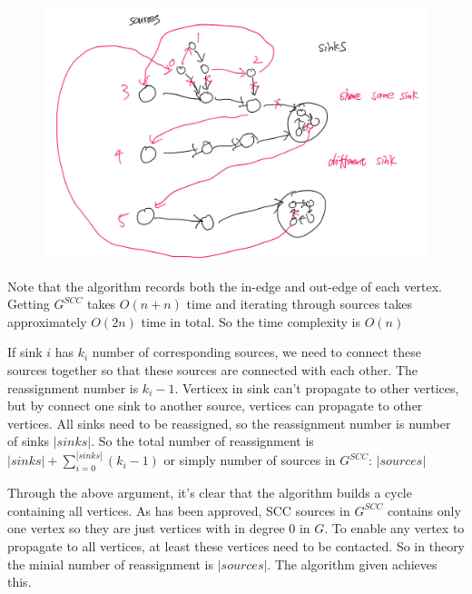 \documentclass[12pt,a4paper]{article}
\begin{document}
\begin{figure}[hbt!]
  \centering
  \includegraphics[width = 1\textwidth]{img/q24D.jpg}
\end{figure}

\newpage
Note that the algorithm records both the in-edge and out-edge of each vertex. Getting $G^{SCC}$ takes $O(n + n)$ time and iterating through sources takes approximately $O(2n)$ time in total. So the time complexity is $O(n)$

If sink $i$ has $k_i$ number of corresponding sources, we need to connect these sources together so that these sources are connected with each other. The reassignment number is $k_i - 1$.
Verticex in sink can't propagate to other vertices, but by connect one sink to another source, vertices can propagate to other vertices. All sinks need to be reassigned, so the reassignment number is number of sinks $|sinks|$. So the total number of reassignment is $|sinks| + \sum_{i = 0}^{|sinks|}(k_i - 1)$ or simply number of sources in $G^{SCC}$: $|sources|$

Through the above argument, it's clear that the algorithm builds a cycle containing all vertices. As has been approved, SCC sources in $G^{SCC}$ contains only one vertex so they are just vertices with in degree 0 in $G$. To enable any vertex to propagate to all vertices, at least these vertices need to be contacted. So in theory the minial number of reassignment is $|sources|$. The algorithm given achieves this.
\end{document}
